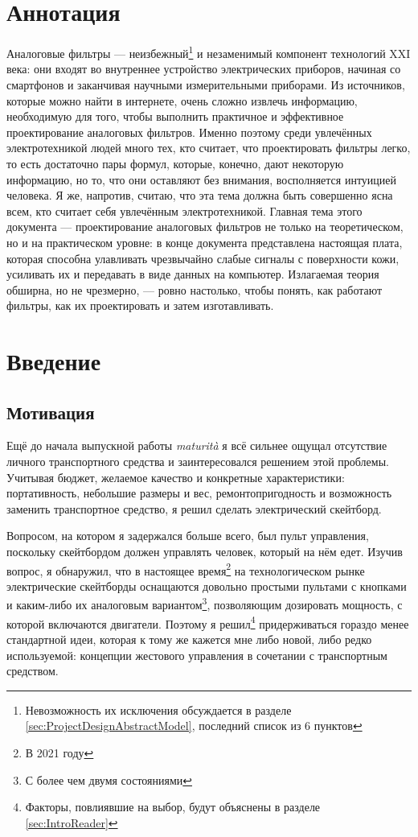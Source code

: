 \documentclass[a4paper, 10pt, final]{article} %
\begin{document}
    \section*{Аннотация}
    \par Аналоговые фильтры --- неизбежный\footnote{Невозможность их исключения обсуждается в разделе \ref{sec:ProjectDesignAbstractModel}, последний список из 6 пунктов} и незаменимый компонент технологий XXI века: они входят во внутреннее устройство электрических приборов, начиная со смартфонов и заканчивая научными измерительными приборами.
    Из источников, которые можно найти в интернете, очень сложно извлечь информацию, необходимую для того, чтобы выполнить практичное и эффективное проектирование аналоговых фильтров.
    Именно поэтому среди увлечённых электротехникой людей много тех, кто считает, что проектировать фильтры легко, то есть достаточно пары формул, которые, конечно, дают некоторую информацию, но то, что они оставляют без внимания, восполняется интуицией человека.
    Я же, напротив, считаю, что эта тема должна быть совершенно ясна всем, кто считает себя увлечённым электротехникой.
    Главная тема этого документа --- проектирование аналоговых фильтров не только на теоретическом, но и на практическом уровне: в конце документа представлена настоящая плата, которая способна улавливать чрезвычайно слабые сигналы с поверхности кожи, усиливать их и передавать в виде данных на компьютер.
    Излагаемая теория обширна, но не чрезмерно, --- ровно настолько, чтобы понять, как работают фильтры, как их проектировать и затем изготавливать.
    \clearpage
    \tableofcontents

    \clearpage
    \section{Введение}\label{sec:Intro}
    \subsection{Мотивация}\label{sec:IntroMotivation}
    Ещё до начала выпускной работы \emph{maturit\`{a}} я всё сильнее ощущал отсутствие личного транспортного средства и заинтересовался решением этой проблемы.
    Учитывая бюджет, желаемое качество и конкретные характеристики: портативность, небольшие размеры и вес, ремонтопригодность и возможность заменить транспортное средство, я решил сделать электрический скейтборд.
    
    Вопросом, на котором я задержался больше всего, был пульт управления, поскольку скейтбордом должен управлять человек, который на нём едет.
    Изучив вопрос, я обнаружил, что в настоящее время\footnote{В 2021 году} на технологическом рынке электрические скейтборды оснащаются довольно простыми пультами с кнопками и каким-либо их аналоговым вариантом\footnote{С более чем двумя состояниями}, позволяющим дозировать мощность, с которой включаются двигатели.
    Поэтому я решил\footnote{Факторы, повлиявшие на выбор, будут объяснены в разделе \ref{sec:IntroReader}} придерживаться гораздо менее стандартной идеи, которая к тому же кажется мне либо новой, либо редко используемой: концепции жестового управления в сочетании с транспортным средством.
    
\end{document}
